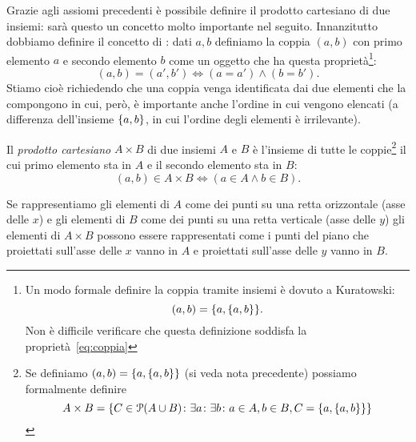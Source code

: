 Grazie agli assiomi precedenti è possibile definire il prodotto cartesiano
di due insiemi: sarà questo un concetto molto importante nel seguito.
Innanzitutto dobbiamo definire il concetto di : dati
$a,b$ definiamo la coppia $(a,b)$ con primo elemento $a$ e secondo elemento $b$
come un oggetto che ha questa proprietà\footnote{%
Un modo formale definire la coppia tramite insiemi 
è dovuto a Kuratowski:
\[
   (a,b) = {\left\{ a,{\left\{ a,b \right\}} \right\}}.
\]
Non è difficile verificare che questa definizione soddisfa la 
proprietà~\eqref{eq:coppia}
}:
\begin{equation}\label{eq:coppia}
  (a, b) = (a', b') \iff (a=a') \land (b=b').
\end{equation}
Stiamo cioè richiedendo che una coppia venga identificata dai due
elementi che la compongono in cui, però, è importante anche l'ordine in
cui vengono elencati (a differenza dell'insieme ${\left\{ a,b \right\}}$, in cui
l'ordine degli elementi è irrilevante).

Il \emph{prodotto cartesiano} $A\times B$ di due insiemi $A$ e $B$
è l'insieme di tutte le coppie\footnote{%
Se definiamo $(a,b) = {\left\{ a,{\left\{ a,b \right\}} \right\}}$ (si veda nota precedente)
possiamo formalmente definire 
\[
A\times B = {\left\{ C\in \mathcal P(A\cup B)\colon 
\exists a\colon \exists b\colon a\in A, b\in B, C={\left\{ a,{\left\{ a,b \right\}} \right\}}
 \right\}}  
\]
} il cui primo elemento sta in $A$ e
il secondo elemento sta in $B$:
\[
  (a, b) \in A \times B \iff (a\in A \land b\in B).
\]

Se rappresentiamo gli elementi di $A$ come dei punti su una retta
orizzontale (asse delle $x$) e gli elementi di $B$ come dei punti
su una retta verticale (asse delle $y$) gli elementi di $A\times B$
possono essere rappresentati come i punti del piano che proiettati sull'asse
delle $x$ vanno in $A$ e proiettati sull'asse delle $y$ vanno in $B$.

